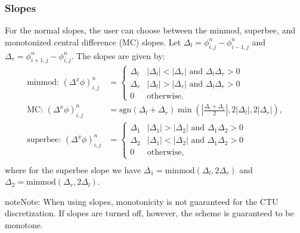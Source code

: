 \documentclass[letterpaper,10pt,english]{sphinxmanual}
\begin{document}
\subsubsection{Slopes}
\label{\detokenize{Solvers/CDR:slopes}}\label{\detokenize{Solvers/CDR:chap-ctuslopes}}
For the normal slopes, the user can choose between the minmod, superbee, and monotonized central difference (MC) slopes.
Let \(\Delta_l = \phi_{i,j}^n - \phi_{i-1,j}^n\) and \(\Delta_r = \phi_{i+1,j}^n - \phi_{i,j}^n\).
The slopes are given by:
\begin{equation*}
\begin{split}\text{minmod: }\left(\Delta^x\phi\right)_{i,j}^n &= \begin{cases}
\Delta_l & |\Delta_l| < |\Delta_r| \text { and } \Delta_l\Delta_r > 0 \\
\Delta_r & |\Delta_l| > |\Delta_r| \text { and } \Delta_l\Delta_r > 0 \\
0 & \text{otherwise}.
\end{cases} \\[1ex]
\text{MC: } \left(\Delta^x\phi\right)_{i,j}^n &= \text{sgn}\left(\Delta_l + \Delta_r\right)\min\left(\left|\frac{\Delta_l + \Delta_r}{2}\right|, 2\left|\Delta_l\right|, 2\left|\Delta_r\right|\right),\\[1ex]
\text{superbee: }\left(\Delta^x\phi\right)_{i,j}^n &= \begin{cases}
\Delta_1 & |\Delta_1| > |\Delta_2| \text { and } \Delta_1\Delta_2 > 0 \\
\Delta_2 & |\Delta_1| < |\Delta_2| \text { and } \Delta_1\Delta_2 > 0 \\
0 & \text{otherwise},
\end{cases} \\[1ex]\end{split}
\end{equation*}
where for the superbee slope we have \(\Delta_1 = \text{minmod}\left(\Delta_l, 2\Delta_r\right)\) and \(\Delta_2 = \text{minmod}\left(\Delta_r, 2\Delta_l\right)\).

\begin{sphinxadmonition}{note}{Note:}
When using slopes, monotonicity is not guaranteed for the CTU discretization.
If slopes are turned off, however, the scheme is guaranteed to be monotone.
\end{sphinxadmonition}
\end{document}
